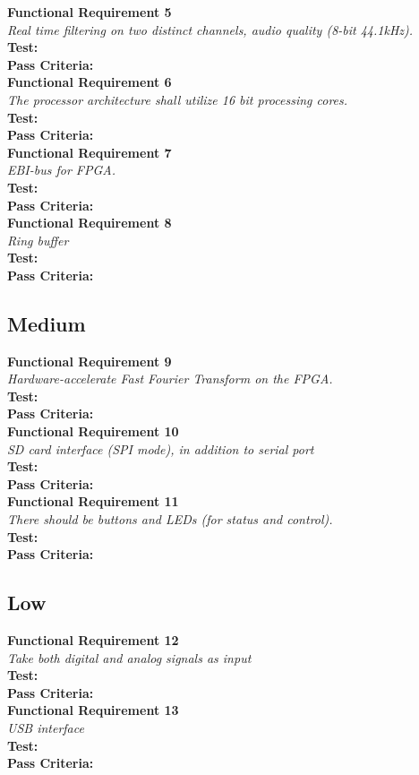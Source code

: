 \textbf{Functional Requirement 5}
\\
\textit{Real time filtering on two distinct channels, audio quality (8-bit 44.1kHz).}
\\
\textbf{Test:}
\\
\textbf{Pass Criteria:}
\\
\textbf{Functional Requirement 6}
\\
\textit{The processor architecture shall utilize 16 bit processing cores.}
\\
\textbf{Test:}
\\
\textbf{Pass Criteria:}
\\
\textbf{Functional Requirement 7}
\\
\textit{EBI-bus for FPGA.}
\\
\textbf{Test:}
\\
\textbf{Pass Criteria:}
\\
\textbf{Functional Requirement 8}
\\
\textit{Ring buffer}
\\
\textbf{Test:}
\\
\textbf{Pass Criteria:}
\\


\subsection{Medium}
\textbf{Functional Requirement 9}
\\
\textit{Hardware-accelerate Fast Fourier Transform on the FPGA.}
\\
\textbf{Test:}
\\
\textbf{Pass Criteria:}
\\
\textbf{Functional Requirement 10}
\\
\textit{SD card interface (SPI mode), in addition to serial port}
\\
\textbf{Test:}
\\
\textbf{Pass Criteria:}
\\
\textbf{Functional Requirement 11}
\\
\textit{There should be buttons and LEDs (for status and control).}
\\
\textbf{Test:}
\\
\textbf{Pass Criteria:}
\\


\subsection{Low}
\textbf{Functional Requirement 12}
\\
\textit{Take both digital and analog signals as input}
\\
\textbf{Test:}
\\
\textbf{Pass Criteria:}
\\
\textbf{Functional Requirement 13}
\\
\textit{USB interface}
\\
\textbf{Test:}
\\
\textbf{Pass Criteria:}
\\

